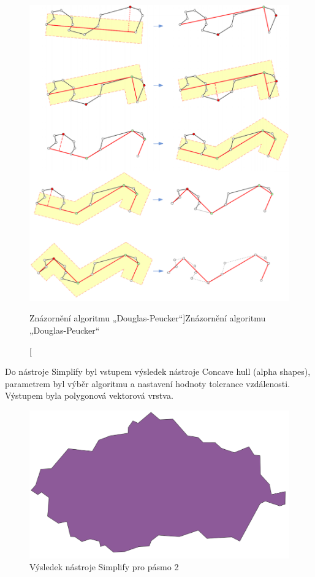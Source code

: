 \begin{figure}[H] \centering
    \includegraphics[width=400pt]{./pictures/douglas.png}
    \caption[Znázornění algoritmu „Douglas-Peucker“]{Znázornění algoritmu „Douglas-Peucker“ \cite{bayer-douglas}}
	\label{fig:douglas}              
\end{figure} 

Do nástroje Simplify byl vstupem výsledek nástroje Concave hull (alpha shapes), parametrem byl výběr algoritmu 
a nastavení hodnoty tolerance vzdálenosti. Výstupem byla polygonová vektorová vrstva.

\begin{figure}[H] \centering
    \includegraphics[width=400pt]{./pictures/simplify.png}
    \caption[Výsledek nástroje Simplify pro pásmo 2]{Výsledek nástroje Simplify pro pásmo 2}
	\label{fig:simplify}                                
\end{figure}

